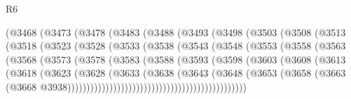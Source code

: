 \begin{lexlean}{R6}
\begin{coremodule}
                (@3468
                  (@3473
                    (@3478
                      (@3483
                        (@3488
                          (@3493
                            (@3498
                              (@3503
                                (@3508
                                  (@3513
                                    (@3518
                                      (@3523
                                        (@3528
                                          (@3533
                                            (@3538
                                              (@3543
                                                (@3548
                                                  (@3553
                                                    (@3558
                                                      (@3563
                                                        (@3568
                                                          (@3573
                                                            (@3578
                                                              (@3583
                                                                (@3588
                                                                  (@3593
                                                                    (@3598
                                                                      (@3603
                                                                        (@3608
                                                                          (@3613
                                                                            (@3618
                                                                              (@3623
                                                                                (@3628
                                                                                  (@3633
                                                                                    (@3638
                                                                                      (@3643
                                                                                        (@3648
                                                                                          (@3653
                                                                                            (@3658
                                                                                              (@3663
                                                                                                (@3668
                                                                                                  @3938)))))))))))))))))))))))))))))))))))))))))))))))

\end{coremodule}
\end{lexlean}
